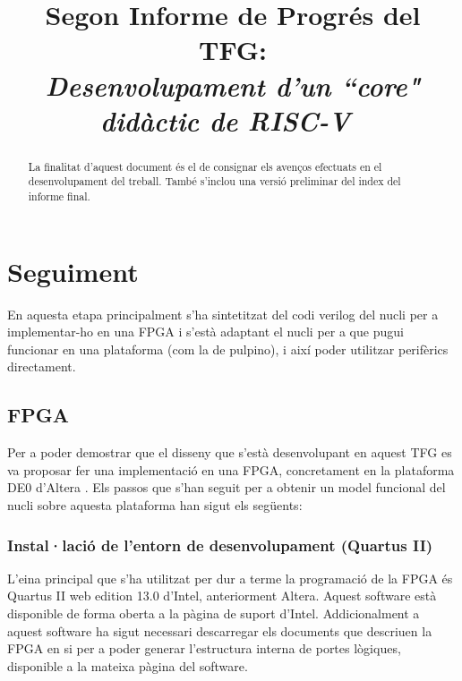 \documentclass[conference,onecolumn, catalan]{IEEEtran}
\title{Segon Informe de Progrés del TFG: \\ \vspace{0.2cm} {\huge \textit{ Desenvolupament d'un ``core" didàctic de RISC-V\ }} }
\author{
\IEEEauthorblockN{Pau Casacuberta Orta}
\IEEEauthorblockA{
\textit{Autonomous University of Barcelona}\\
Cerdanyola del Vallès, Barcelona 08193\\
pau.casacubertao@e-campus.uab.cat\\}}
\begin{document}
\maketitle

\begin{versionhistory}
\end{versionhistory}


\begin{abstract}
La finalitat d'aquest document és el de consignar els avenços efectuats en el desenvolupament del treball. També s'inclou una versió preliminar del index del informe final.
\end{abstract}



\section{Seguiment}

En aquesta etapa principalment s'ha sintetitzat del codi verilog del nucli per a implementar-ho en una FPGA i s'està adaptant el nucli per a que pugui funcionar en una plataforma (com la de pulpino), i així poder utilitzar perifèrics directament.


\subsection{FPGA}

Per a poder demostrar que el disseny que s'està desenvolupant en aquest TFG es va proposar fer una implementació en una FPGA, concretament en la plataforma DE0 d'Altera \cite{technologies_terasic_nodate}. Els passos que s'han seguit per a obtenir un model funcional del nucli sobre aquesta plataforma han sigut els següents:


\subsubsection{Instal·lació de l'entorn de desenvolupament (Quartus II)}

L'eina principal que s'ha utilitzat per dur a terme la programació de la FPGA és Quartus II web edition 13.0 \cite{jose_quartus_2013} d'Intel, anteriorment Altera. Aquest software està disponible de forma oberta a la pàgina de suport d'Intel. Addicionalment a aquest software ha sigut necessari descarregar els documents que descriuen la FPGA en si per a poder generar l'estructura interna de portes lògiques, disponible a la mateixa pàgina del software.
\end{document}
